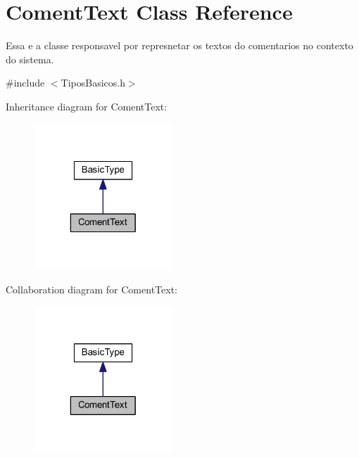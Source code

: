 \hypertarget{class_coment_text}{\section{Coment\-Text Class Reference}
\label{class_coment_text}
}


Essa e a classe responsavel por represnetar os textos do comentarios no contexto do sistema.  




{\ttfamily \#include $<$Tipos\-Basicos.\-h$>$}



Inheritance diagram for Coment\-Text\-:\nopagebreak
\begin{figure}[H]
\begin{center}
\leavevmode
\includegraphics[width=148pt]{class_coment_text__inherit__graph}
\end{center}
\end{figure}


Collaboration diagram for Coment\-Text\-:\nopagebreak
\begin{figure}[H]
\begin{center}
\leavevmode
\includegraphics[width=148pt]{class_coment_text__coll__graph}
\end{center}
\end{figure}
